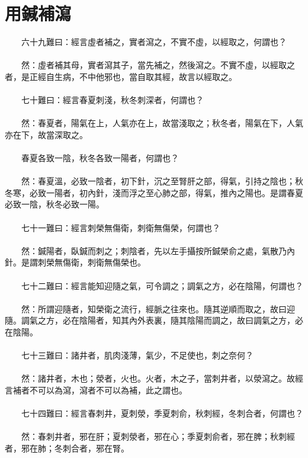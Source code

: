 \section{用鍼補瀉}

　　六十九難曰：經言虛者補之，實者瀉之，不實不虛，以經取之，何謂也？
\\\\
　　然：虛者補其母，實者瀉其子，當先補之，然後瀉之。不實不虛，以經取之者，是正經自生病，不中他邪也，當自取其經，故言以經取之。
\\\\
　　七十難曰：經言春夏刺淺，秋冬刺深者，何謂也？
\\\\
　　然：春夏者，陽氣在上，人氣亦在上，故當淺取之；秋冬者，陽氣在下，人氣亦在下，故當深取之。
\\\\
　　春夏各致一陰，秋冬各致一陽者，何謂也？
\\\\
　　然：春夏溫，必致一陰者，初下針，沉之至腎肝之部，得氣，引持之陰也；秋冬寒，必致一陽者，初內針，淺而浮之至心肺之部，得氣，推內之陽也。是謂春夏必致一陰，秋冬必致一陽。
\\\\
　　七十一難曰：經言刺榮無傷衛，刺衛無傷榮，何謂也？
\\\\
　　然：鍼陽者，臥鍼而刺之；刺陰者，先以左手攝按所鍼榮俞之處，氣散乃內針。是謂刺榮無傷衛，刺衛無傷榮也。
\\\\
　　七十二難曰：經言能知迎隨之氣，可令調之；調氣之方，必在陰陽，何謂也？
\\\\
　　然：所謂迎隨者，知榮衛之流行，經脈之往來也。隨其逆順而取之，故曰迎隨。調氣之方，必在陰陽者，知其內外表裏，隨其陰陽而調之，故曰調氣之方，必在陰陽。
\\\\
　　七十三難曰：諸井者，肌肉淺薄，氣少，不足使也，刺之奈何？
\\\\
　　然：諸井者，木也；滎者，火也。火者，木之子，當刺井者，以滎瀉之。故經言補者不可以為瀉，瀉者不可以為補，此之謂也。
\\\\
　　七十四難曰：經言春刺井，夏刺滎，季夏刺俞，秋刺經，冬刺合者，何謂也？
\\\\
　　然：春刺井者，邪在肝；夏刺滎者，邪在心；季夏刺俞者，邪在脾；秋刺經者，邪在肺；冬刺合者，邪在腎。
